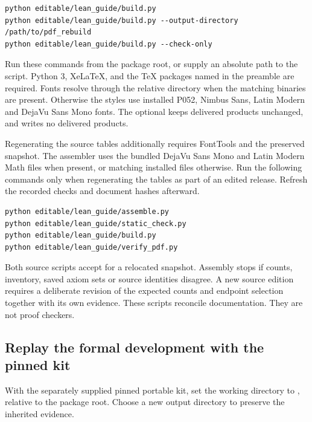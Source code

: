 \begin{Verbatim}[fontsize=\small,breaklines=true,breakanywhere=true]
python editable/lean_guide/build.py
python editable/lean_guide/build.py --output-directory /path/to/pdf_rebuild
python editable/lean_guide/build.py --check-only
\end{Verbatim}

Run these commands from the package root, or supply an absolute path to the script. Python 3, XeLaTeX,  and the TeX packages named in the preamble are required. Fonts resolve through the relative  directory when the matching binaries are present. Otherwise the styles use installed P052, Nimbus Sans, Latin Modern and DejaVu Sans Mono fonts. The optional  keeps delivered products unchanged, and  writes no delivered products.

Regenerating the source tables additionally requires FontTools and the preserved snapshot. The assembler uses the bundled DejaVu Sans Mono and Latin Modern Math files when present, or matching installed files otherwise. Run the following commands only when regenerating the tables as part of an edited release. Refresh the recorded checks and document hashes afterward.

\begin{Verbatim}[fontsize=\small,breaklines=true,breakanywhere=true]
python editable/lean_guide/assemble.py
python editable/lean_guide/static_check.py
python editable/lean_guide/build.py
python editable/lean_guide/verify_pdf.py
\end{Verbatim}

Both source scripts accept  for a relocated snapshot. Assembly stops if counts, inventory, saved axiom sets or source identities disagree. A new source edition requires a deliberate revision of the expected counts and endpoint selection together with its own evidence. These scripts reconcile documentation. They are not proof checkers.

\subsection{Replay the formal development with the pinned kit}
With the separately supplied pinned portable kit, set the working directory to , relative to the package root. Choose a new output directory to preserve the inherited evidence.

